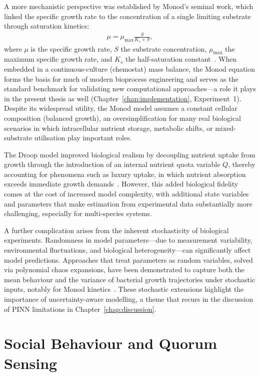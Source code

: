 \documentclass[14pt,a4paper,openany]{extbook}
\begin{document}
A more mechanistic perspective was established by Monod's seminal work, which linked the specific growth rate to the concentration of a single limiting substrate through saturation kinetics:
\begin{align}
    \mu = \mu_{\max} \frac{S}{K_s + S},
\end{align}
where $\mu$ is the specific growth rate, $S$ the substrate concentration, $\mu_{\max}$ the maximum specific growth rate, and $K_s$ the half-saturation constant~\cite{monod1949}. When embedded in a continuous-culture (chemostat) mass balance, the Monod equation forms the basis for much of modern bioprocess engineering and serves as the standard benchmark for validating new computational approaches---a role it plays in the present thesis as well (Chapter~\ref{chap:implementation}, Experiment~1). Despite its widespread utility, the Monod model assumes a constant cellular composition (balanced growth), an oversimplification for many real biological scenarios in which intracellular nutrient storage, metabolic shifts, or mixed-substrate utilisation play important roles.

The Droop model improved biological realism by decoupling nutrient uptake from growth through the introduction of an internal nutrient quota variable $Q$, thereby accounting for phenomena such as luxury uptake, in which nutrient absorption exceeds immediate growth demands~\cite{wang2022mathematical}. However, this added biological fidelity comes at the cost of increased model complexity, with additional state variables and parameters that make estimation from experimental data substantially more challenging, especially for multi-species systems.

A further complication arises from the inherent stochasticity of biological experiments. Randomness in model parameters---due to measurement variability, environmental fluctuations, and biological heterogeneity---can significantly affect model predictions. Approaches that treat parameters as random variables, solved via polynomial chaos expansions, have been demonstrated to capture both the mean behaviour and the variance of bacterial growth trajectories under stochastic inputs, notably for Monod kinetics~\cite{stanescu2009}. These stochastic extensions highlight the importance of uncertainty-aware modelling, a theme that recurs in the discussion of PINN limitations in Chapter~\ref{chap:discussion}.


\section{Social Behaviour and Quorum Sensing}
\label{sec:quorum}
\end{document}
